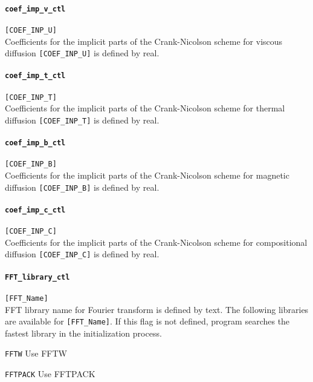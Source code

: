 \paragraph{\tt coef\_imp\_v\_ctl}
\label{href_t:coef_imp_v_ctl}
\verb|[COEF_INP_U]| \\
Coefficients for the implicit parts of the Crank-Nicolson scheme for viscous diffusion \verb|[COEF_INP_U]| is defined by real.

\paragraph{\tt coef\_imp\_t\_ctl}
\label{href_t:coef_imp_t_ctl}
\verb|[COEF_INP_T]| \\
Coefficients for the implicit parts of the Crank-Nicolson scheme for thermal diffusion \verb|[COEF_INP_T]| is defined by real.

\paragraph{\tt coef\_imp\_b\_ctl}
\label{href_t:coef_imp_b_ctl}
\verb|[COEF_INP_B]| \\
Coefficients for the implicit parts of the Crank-Nicolson scheme for magnetic diffusion \verb|[COEF_INP_B]| is defined by real.

\paragraph{\tt coef\_imp\_c\_ctl}
\label{href_t:coef_imp_c_ctl}
\verb|[COEF_INP_C]| \\
Coefficients for the implicit parts of the Crank-Nicolson scheme for compositional diffusion \verb|[COEF_INP_C]| is defined by real. 


\paragraph{\tt FFT\_library\_ctl}
\label{href_t:FFT_library_ctl}
\verb|[FFT_Name]| \\
FFT library name for Fourier transform is defined by text. The following libraries are available for \verb|[FFT_Name]|. 
If this flag is not defined, program searches the fastest library in the initialization process.
%
\begin{description}
\item{\tt FFTW}		Use FFTW
\item{\tt FFTPACK}	Use FFTPACK
\end{description}
%

